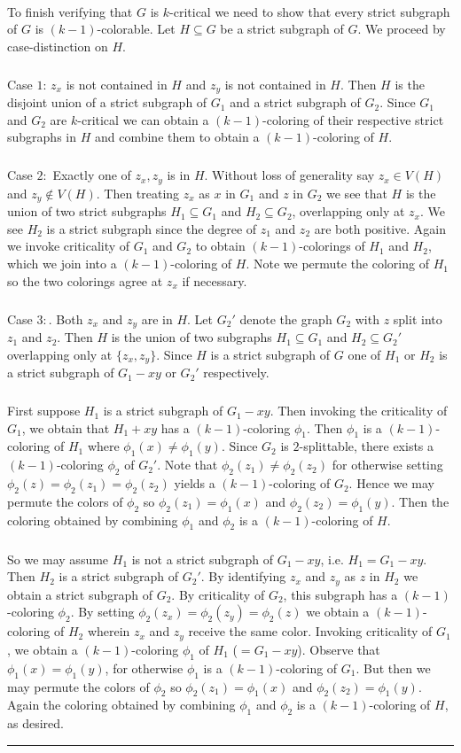 \documentclass[letterpaper,12pt,oneside,onecolumn]{article}
\newenvironment{proof}{{\bf Proof:  }}{\hfill\rule{2mm}{2mm}}
\begin{document}
\begin{proof}
	\paragraph{}
	To finish verifying that $G$ is $k$-critical we need to show that every strict subgraph of $G$ is $(k-1)$-colorable. Let $H \subseteq G$ be a strict subgraph of $G$. We proceed by case-distinction on $H$.
		\subparagraph{} Case $1$: $z_x$ is not contained in $H$ and $z_y$ is not contained in $H$. Then $H$ is the disjoint union of a strict subgraph of $G_1$ and a strict subgraph of $G_2$. Since $G_1$ and $G_2$ are $k$-critical we can obtain a $(k-1)$-coloring of their respective strict subgraphs in $H$ and combine them to obtain a $(k-1)$-coloring of $H$.
		\subparagraph{} Case $2:$ Exactly one of $z_x, z_y$ is in $H$. Without loss of generality say $z_x \in V(H)$ and $z_y \not\in V(H)$. Then treating $z_x$ as $x$ in $G_1$ and $z$ in $G_2$ we see that $H$ is the union of two strict subgraphs $H_1 \subseteq G_1$ and $H_2 \subseteq G_2$, overlapping only at $z_x$. We see $H_2$ is a strict subgraph since the degree of $z_1$ and $z_2$ are both positive. Again we invoke criticality of $G_1$ and $G_2$ to obtain $(k-1)$-colorings of $H_1$ and $H_2$, which we join into a $(k-1)$-coloring of $H$. Note we permute the coloring of $H_1$ so the two colorings agree at $z_x$ if necessary.
		\subparagraph{} Case $3:$. Both $z_x$ and $z_y$ are in $H$. Let $G_2'$ denote the graph $G_2$ with $z$ split into $z_1$ and $z_2$. Then $H$ is the union of two subgraphs $H_1 \subseteq G_1$ and $H_2 \subseteq G_2'$ overlapping only at $\{z_x,z_y\}$. Since $H$ is a strict subgraph of $G$ one of $H_1$ or $H_2$ is a strict subgraph of $G_1-xy$ or $G_2'$ respectively.
		\subparagraph{} First suppose $H_1$ is a strict subgraph of $G_1-xy$. Then invoking the criticality of $G_1$, we obtain that $H_1 + xy$ has a $(k-1)$-coloring $\phi_1$. Then $\phi_1$ is a $(k-1)$-coloring of $H_1$ where $\phi_1(x)\neq \phi_1(y)$. Since $G_2$ is $2$-splittable, there exists a $(k-1)$-coloring $\phi_2$ of $G_2'$. Note that $\phi_2(z_1) \neq \phi_2(z_2)$ for otherwise setting $\phi_2(z) = \phi_2(z_1) = \phi_2(z_2)$ yields a $(k-1)$-coloring of $G_2$. Hence we may permute the colors of $\phi_2$ so $\phi_2(z_1) = \phi_1(x)$ and $\phi_2(z_2) = \phi_1(y)$. Then the coloring obtained by combining $\phi_1$ and $\phi_2$ is a $(k-1)$-coloring of $H$.
		\subparagraph{}
		So we may assume $H_1$ is not a strict subgraph of $G_1-xy$, i.e. $H_1 = G_1-xy$. Then $H_2$ is a strict subgraph of $G_2'$. By identifying $z_x$ and $z_y$ as $z$ in $H_2$ we obtain a strict subgraph of $G_2$. By criticality of $G_2$, this subgraph has a $(k-1)$-coloring $\phi_2$. By setting $\phi_2(z_x) = \phi_2(z_y) = \phi_2(z)$ we obtain a $(k-1)$-coloring of $H_2$ wherein $z_x$ and $z_y$ receive the same color. Invoking criticality of $G_1$, we obtain a $(k-1)$-coloring $\phi_1$ of $H_1$ ($=G_1-xy$). Observe that $\phi_1(x) = \phi_1(y)$, for otherwise $\phi_1$ is a $(k-1)$-coloring of $G_1$. But then we may permute the colors of $\phi_2$ so $\phi_2(z_1) = \phi_1(x)$ and $\phi_2(z_2) = \phi_1(y)$. Again the coloring obtained by combining $\phi_1$ and $\phi_2$ is a $(k-1)$-coloring of $H$, as desired.

\end{proof}
\end{document}
